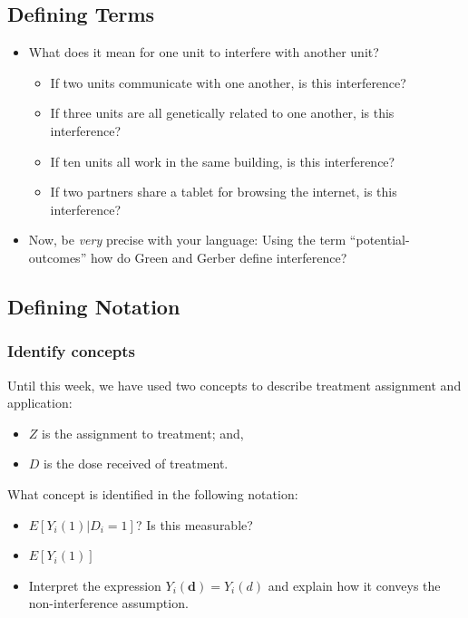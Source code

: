 \documentclass[
]{article}
\providecommand{\tightlist}{%
  \setlength{\itemsep}{0pt}\setlength{\parskip}{0pt}}
\begin{document}
\hypertarget{defining-terms}{%
\subsection{Defining Terms}\label{defining-terms}}

\begin{itemize}
\tightlist
\item
  What does it mean for one unit to interfere with another unit?

  \begin{itemize}
  \tightlist
  \item
    If two units communicate with one another, is this interference?
  \item
    If three units are all genetically related to one another, is this interference?
  \item
    If ten units all work in the same building, is this interference?
  \item
    If two partners share a tablet for browsing the internet, is this interference?
  \end{itemize}
\item
  Now, be \emph{very} precise with your language: Using the term ``potential-outcomes'' how do Green and Gerber define interference?
\end{itemize}

\hypertarget{defining-notation}{%
\subsection{Defining Notation}\label{defining-notation}}

\hypertarget{identify-concepts}{%
\subsubsection{Identify concepts}\label{identify-concepts}}

Until this week, we have used two concepts to describe treatment assignment and application:

\begin{itemize}
\tightlist
\item
  \(Z\) is the assignment to treatment; and,
\item
  \(D\) is the dose received of treatment.
\end{itemize}

What concept is identified in the following notation:

\begin{itemize}
\tightlist
\item
  \(E[Y_{i}(1) | D_{i} = 1]\)? Is this measurable?
\item
  \(E[Y_{i}(1)]\)
\item
  Interpret the expression \(Y_{i}(\mathbf{d}) = Y_{i}(d)\) and explain how it conveys the non-interference assumption.
\end{itemize}
\end{document}
